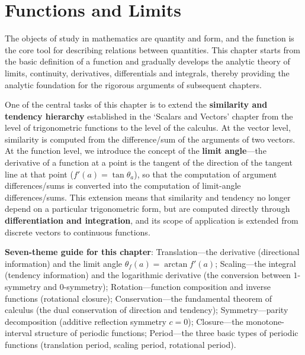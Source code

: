 \chapter{Functions and Limits}

\begin{remark}\label{rem:function_chapter_positioning}
The objects of study in mathematics are quantity and form, and the function is the core tool for describing relations between quantities. This chapter starts from the basic definition of a function and gradually develops the analytic theory of limits, continuity, derivatives, differentials and integrals, thereby providing the analytic foundation for the rigorous arguments of subsequent chapters.

One of the central tasks of this chapter is to extend the \textbf{similarity and tendency hierarchy} established in the `Scalars and Vectors' chapter from the level of trigonometric functions to the level of the calculus. At the vector level, similarity is computed from the difference/sum of the arguments of two vectors. At the function level, we introduce the concept of the \textbf{limit angle}---the derivative of a function at a point is the tangent of the direction of the tangent line at that point ($f'(a) = \tan\theta_a$), so that the computation of argument differences/sums is converted into the computation of limit-angle differences/sums. This extension means that similarity and tendency no longer depend on a particular trigonometric form, but are computed directly through \textbf{differentiation and integration}, and its scope of application is extended from discrete vectors to continuous functions.

\textbf{Seven-theme guide for this chapter}: Translation---the derivative (directional information) and the limit angle $\theta_f(a)=\arctan f'(a)$; Scaling---the integral (tendency information) and the logarithmic derivative (the conversion between $1$-symmetry and $0$-symmetry); Rotation---function composition and inverse functions (rotational closure); Conservation---the fundamental theorem of calculus (the dual conservation of direction and tendency); Symmetry---parity decomposition (additive reflection symmetry $c=0$); Closure---the monotone-interval structure of periodic functions; Period---the three basic types of periodic functions (translation period, scaling period, rotational period).
\end{remark}

